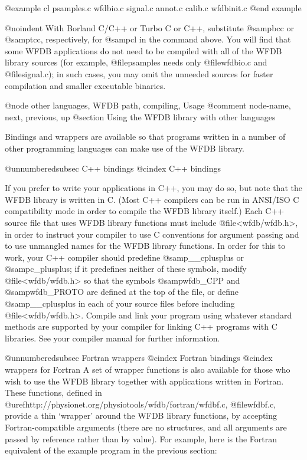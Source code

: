 {@example
cl psamples.c wfdbio.c signal.c annot.c calib.c wfdbinit.c
@end example

@noindent
With Borland C/C++ or Turbo C or C++, substitute @samp{bcc} or
@samp{tcc}, respectively, for @samp{cl} in the command above.  You will
find that some WFDB applications do not need to be compiled with all of
the WFDB library sources (for example, @file{psamples} needs only
@file{wfdbio.c} and @file{signal.c}); in such cases, you may omit the
unneeded sources for faster compilation and smaller executable binaries.


@node     other languages, WFDB path, compiling, Usage
@comment  node-name,  next,  previous,  up
@section Using the WFDB library with other languages

Bindings and wrappers are available so that programs written in a
number of other programming languages can make use of the WFDB library.

@unnumberedsubsec C++ bindings
@cindex C++ bindings

If you prefer to write your applications in C++, you may do so, but note
that the WFDB library is written in C.  (Most C++ compilers can be run
in ANSI/ISO C compatibility mode in order to compile the WFDB library
itself.)  Each C++ source file that uses WFDB library functions must
include @file{<wfdb/wfdb.h>}, in order to instruct your compiler to use
C conventions for argument passing and to use unmangled names for the
WFDB library functions.  In order for this to work, your C++ compiler
should predefine @samp{__cplusplus} or @samp{c_plusplus}; if it
predefines neither of these symbols, modify @file{<wfdb/wfdb.h>} so that
the symbols @samp{wfdb_CPP} and @samp{wfdb_PROTO} are defined at the top
of the file, or define @samp{__cplusplus} in each of your source files
before including @file{<wfdb/wfdb.h>}.  Compile and link your program
using whatever standard methods are supported by your compiler for
linking C++ programs with C libraries.  See your compiler manual for
further information.

@unnumberedsubsec Fortran wrappers
@cindex Fortran bindings
@cindex wrappers for Fortran
A set of wrapper functions is also available for those who wish to use the WFDB
library together with applications written in Fortran.  These functions,
defined in @uref{http://physionet.org/physiotools/wfdb/fortran/wfdbf.c,
@file{wfdbf.c}}, provide a thin `wrapper' around the WFDB library functions, by
accepting Fortran-compatible arguments (there are no structures, and all
arguments are passed by reference rather than by value).  For example, here is
the Fortran equivalent of the example program in the previous section:

}
